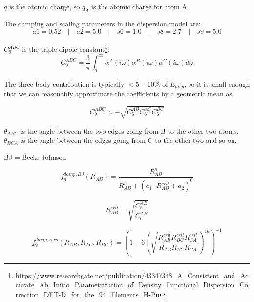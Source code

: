 \documentclass{article}
\makeatletter
\newcommand\footnoteref[1]{\protected@xdef\@thefnmark{\ref{#1}}\@footnotemark}
\makeatother
\begin{document}
\vspace{10pt}
\noindent
\(q\) is the atomic charge, so \(q_A\) is the atomic charge for atom A.

\vspace{10pt}
\noindent
The damping and scaling parameters in the
dispersion model are:
\[
  a1 = 0.52 \quad|\quad a2 = 5.0 \quad|\quad s6 = 1.0 \quad|\quad s8 = 2.7 \quad|\quad s9 = 5.0
\]


\vspace{10pt}
\noindent
\(C_9^{ABC}\) is the triple-dipole constant\footnote{\label{dft-d}https://www.researchgate.net/publication/43347348\_A\_Consistent\_and\_Accurate\_Ab\_Initio\_Parametrization\_of\_Density\_Functional\_Dispersion\_Correction\_DFT-D\_for\_the\_94\_Elements\_H-Pu}:
\begin{equation}
  C_9^{ABC} = \frac{3}{\pi} \int_0^\infty \alpha^A(i\omega) \alpha^B(i\omega)\alpha^C(i\omega)d\omega
\end{equation}


\vspace{10pt}
\noindent
The three-body contribution is typically \(<5-10\%\) of \(E_{disp}\), so it is small enough that we can reasonably approximate the coefficients by a geometric mean as\footnoteref{dft-d}:

\begin{equation}
  C_9^{ABC} \approx -\sqrt{C_6^{AB} C_6^{AC} C_6^{BC}}
\end{equation}


\vspace{10pt}
\noindent
\(\theta_{ABC}\) is the angle between the two edges going from B to the other two atoms. \(\theta_{BCA}\) is the angle between the edges going from C to the other two and so on.


\vspace{10pt}
\noindent
BJ = Becke-Johnson

\begin{equation}
  f_n^{damp,BJ}(R_{AB}) = \frac{R_{AB}^n}{R_{AB}^n + (a_1 \cdot R_{AB}^{crit} + a_2)^6}
\end{equation}

\begin{equation}
  R_{AB}^{crit} = \sqrt{\frac{C_8^{AB}}{C_6^{AB}}}
\end{equation}


\begin{equation}
  f_9^{damp,zero}(R_{AB}, R_{AC}, R_{BC}) = \left(1 + 6 \left(\sqrt{\frac{R_{AB}^{crit} R_{BC}^{crit} R_{CA}^{crit}}{R_{AB} R_{BC} R_{CA}}}\right)^{16}\right)^{-1}
\end{equation}
\end{document}
